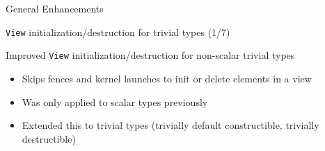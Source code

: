 
\begin{frame}[fragile]

  {\Huge General Enhancements}

  \vspace{10pt}

\end{frame}





%        



\begin{frame}[fragile]{\texttt{View} initialization/destruction for trivial types (1/7)}
  
Improved \texttt{View} initialization/destruction for non-scalar trivial types
\begin{itemize}
  \item Skips fences and kernel launches to init or delete elements in a view
  \item Was only applied to scalar types previously
  \item Extended this to trivial types (trivially default constructible, trivially destructible)
\end{itemize}

\end{frame}

